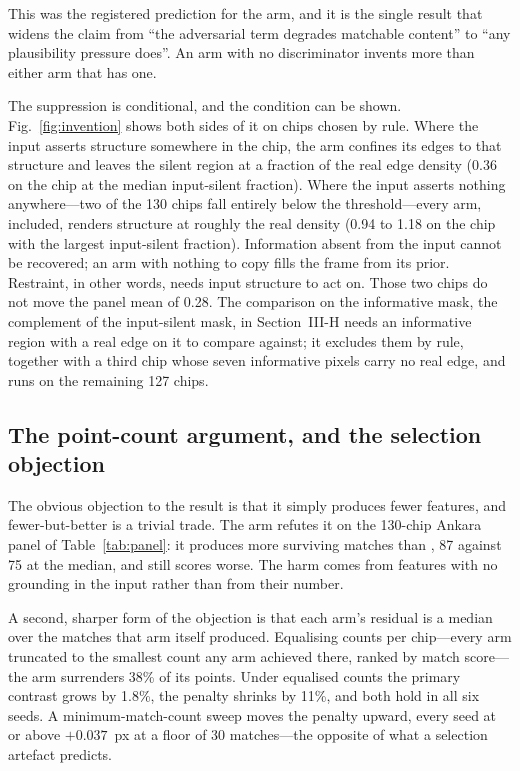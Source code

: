 This was the registered prediction for the \LPIPSonly{} arm, and it is the single result
that widens the claim from ``the adversarial term degrades matchable content'' to ``any
plausibility pressure does''. An arm with no discriminator invents more than either
arm that has one.

The suppression is conditional, and the condition can be shown.
Fig.~\ref{fig:invention} shows both sides of it on chips chosen by rule. Where the input
asserts structure somewhere in the chip, the \Lone{} arm confines its edges to that
structure and leaves the silent region at a fraction of the real edge density (0.36 on
the chip at the median input-silent fraction). Where the input asserts nothing
anywhere---two of the 130 chips fall entirely below the threshold---every arm, \Lone{}
included, renders structure at roughly the real density (0.94 to 1.18 on the chip with the
largest input-silent fraction). Information absent from the input cannot be recovered; an arm with nothing to copy fills the
frame from its prior. Restraint, in other words, needs input structure to act on. Those
two chips do not move the panel mean of 0.28. The comparison on the informative
mask, the complement of the input-silent mask, in Section~III-H needs an informative
region with a real edge on it to compare against; it excludes them by rule, together with
a third chip whose seven informative pixels carry no real edge, and runs on the remaining
127 chips.

\subsection{The point-count argument, and the selection objection}

The obvious objection to the \Lone{} result is that it simply produces fewer features, and
fewer-but-better is a trivial trade. The \LPIPSonly{} arm refutes it on the 130-chip Ankara panel of Table~\ref{tab:panel}: it
produces more surviving matches than \Lone{}, 87 against 75 at the median, and still
scores worse. The harm comes from features with no grounding in the input rather than from their number.

A second, sharper form of the objection is that each arm's residual is a median
over the matches that arm itself produced. Equalising counts per chip---every arm
truncated to the smallest count any arm achieved there, ranked by match score---the
\LPIPSonly{} arm surrenders 38\% of its points. Under equalised counts the primary
contrast grows by 1.8\%, the \LPIPSonly{} penalty shrinks by 11\%, and both hold in all six
seeds. A minimum-match-count sweep moves the penalty upward, every seed at or
above $+0.037$~px at a floor of 30 matches---the opposite of what a selection artefact
predicts.

